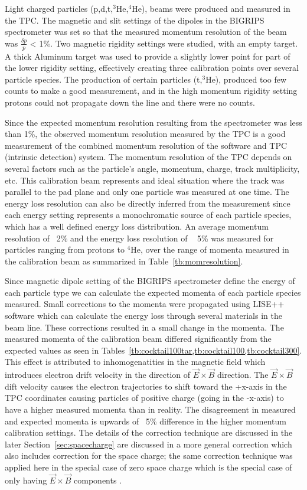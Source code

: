 Light charged particles (p,d,t,${}^{3}$He,${}^{4}$He), beams were produced and measured in the TPC. The magnetic and slit settings of the dipoles in the BIGRIPS spectrometer was set so that the measured momentum resolution of the beam was $\frac{\delta p}{p}$ < 1\%. Two magnetic rigidity settings were studied, with an empty target. A thick Aluminum target was used to provide a slightly lower point for part of the lower rigidity setting, effectively creating three calibration points over several particle species. The production of certain particles (t,${}^{3}$He), produced too few counts to make a good measurement, and in the high momentum rigidity setting protons could not propagate down the line and there were no counts. 

Since the expected momentum resolution resulting from the spectrometer was less than 1\%, the observed momentum resolution measured by the TPC is a good measurement of the combined momentum resolution of the software and TPC (intrinsic detection) system. The momentum resolution of the TPC depends on several factors such as the particle's angle, momentum, charge, track multiplicity, etc. This calibration beam represents and ideal situation where the track was parallel to the pad plane and only one particle was measured at one time. The energy loss resolution can also be directly inferred from the measurement since each energy setting represents a monochromatic source of each particle species, which has a well defined energy loss distribution. An average momentum resolution of ~2\% and the energy loss resolution of ~ 5\% was measured for particles ranging from protons to ${}^{4}$He, over the range of momenta measured in the calibration beam as summarized in Table~\ref{tb:momresolution}.

Since magnetic dipole setting of the BIGRIPS spectrometer define the energy of each particle type we can calculate the expected momenta of each particle species measured. Small corrections to the momenta were propagated using LISE++ software which can calculate the energy loss through several materials in the beam line. These corrections resulted in a small change in the momenta. The measured momenta of the calibration beam differed significantly from the expected values as seen in Tables~\cref{tb:cocktail100tar,tb:cocktail100,tb:cocktail300}. This effect is attributed to inhomogenatities in the magnetic field which introduces electron drift velocity in the direction of $\vec{E}\times\vec{B}$ direction. The $\vec{E}\times\vec{B}$ dift velocity causes the electron trajectories to shift toward the +x-axis in the TPC coordinates causing particles of positive charge (going in the -x-axis) to have a higher measured momenta than in reality. The disagreement in measured and expected momenta is upwards of ~5\% difference in the higher momentum calibration settings. The details of the correction technique are discussed in the later Section~\ref{sec:spacecharge} are discussed in a more general correction which also includes correction for the space charge; the same correction technique was applied here in the special case of zero space charge which is the special case of only having $\vec{E}\times\vec{B}$ components .

